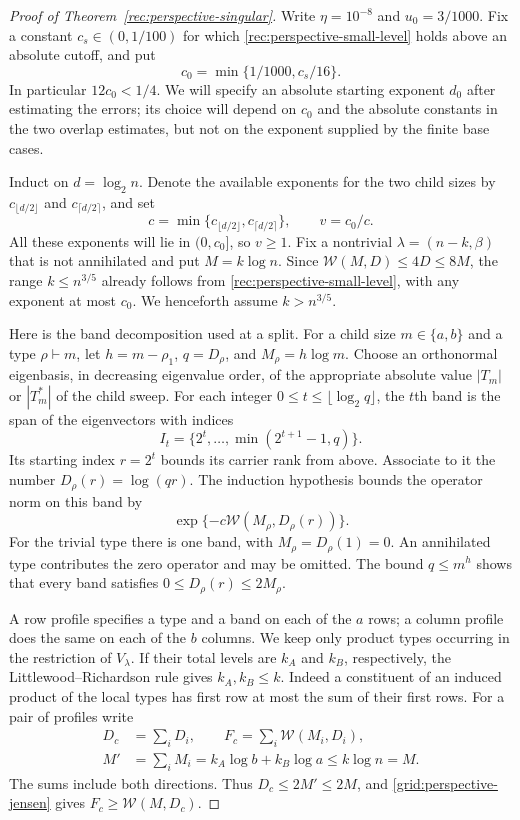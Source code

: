 \begin{proof}[Proof of Theorem~\ref{rec:perspective-singular}]
Write $\eta=10^{-8}$ and $u_0=3/1000$.  Fix a constant
$c_s\in(0,1/100)$ for which
\eqref{rec:perspective-small-level} holds above an absolute cutoff,
and put
\[
 c_0=\min\{1/1000,c_s/16\}.
\]
In particular $12c_0<1/4$.  We will specify an absolute starting
exponent $d_0$ after estimating the errors; its choice will depend
on $c_0$ and the absolute constants in the two overlap estimates,
but not on the exponent supplied by the finite base cases.

Induct on $d=\log_2n$.  Denote the available exponents for the two
child sizes by $c_{\lfloor d/2\rfloor}$ and
$c_{\lceil d/2\rceil}$, and set
\[
 c=\min\{c_{\lfloor d/2\rfloor},c_{\lceil d/2\rceil}\},
 \qquad v=c_0/c.
\]
All these exponents will lie in $(0,c_0]$, so $v\ge1$.  Fix a
nontrivial $\lambda=(n-k,\beta)$ that is not annihilated and put
$M=k\log n$.  Since $\mathcal W(M,D)\le4D\le8M$, the range
$k\le n^{3/5}$ already follows from
\eqref{rec:perspective-small-level}, with any exponent at most
$c_0$.  We henceforth assume $k>n^{3/5}$.

Here is the band decomposition used at a split.  For a child size
$m\in\{a,b\}$ and a type $\rho\vdash m$, let
$h=m-\rho_1$, $q=D_\rho$, and $M_\rho=h\log m$.
Choose an orthonormal eigenbasis, in decreasing eigenvalue order, of
the appropriate absolute value $|T_m|$ or $|T_m^*|$ of the child
sweep.  For each integer
$0\le t\le\lfloor\log_2q\rfloor$, the $t$th band is the span of
the eigenvectors with indices
\[
 I_t=\{2^t,\ldots,\min(2^{t+1}-1,q)\}.
\]
Its starting index $r=2^t$ bounds its carrier rank from above.
Associate to it the number $D_\rho(r)=\log(qr)$.  The induction
hypothesis bounds the operator norm on this band by
\[
 \exp\{-c\mathcal W(M_\rho,D_\rho(r))\}.
\]
For the trivial type there is one band, with $M_\rho=D_\rho(1)=0$.
An annihilated type contributes the zero operator and may be omitted.
The bound $q\le m^h$ shows that every band satisfies
$0\le D_\rho(r)\le2M_\rho$.

A row profile specifies a type and a band on each of the $a$ rows;
a column profile does the same on each of the $b$ columns.  We keep
only product types occurring in the restriction of $V_\lambda$.
If their total levels are $k_A$ and $k_B$, respectively, the
Littlewood--Richardson rule gives $k_A,k_B\le k$.  Indeed a
constituent of an induced product of the local types has first row
at most the sum of their first rows.  For a pair of profiles write
\begin{equation}\label{grid:perspective-profile-parameters}
 \begin{split}
 D_c&=\sum_i D_i,\qquad
 F_c=\sum_i\mathcal W(M_i,D_i),\\
 M'&=\sum_iM_i=k_A\log b+k_B\log a\le k\log n=M.
 \end{split}
\end{equation}
The sums include both directions.  Thus $D_c\le2M'\le2M$, and
\eqref{grid:perspective-jensen} gives
$F_c\ge\mathcal W(M,D_c)$.


\end{proof}
